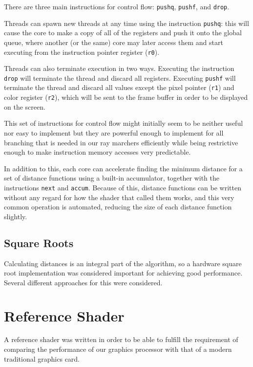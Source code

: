 			There are three main instructions for control flow: \texttt{pushq},
			\texttt{pushf}, and \texttt{drop}. 
			
			Threads can spawn new threads at any time using the instruction
			\texttt{pushq}: this will cause the core to make a copy of all of
			the registers and push it onto the global queue, where another (or
			the same) core may later access them and start executing from the
			instruction pointer register (\texttt{r0}).
			
			Threads can also terminate execution in two ways. Executing the
			instruction \texttt{drop} will terminate the thread and discard all
			registers. Executing \texttt{pushf} will terminate the thread and
			discard all values except the pixel pointer (\texttt{r1}) and color
			register (\texttt{r2}), which will be sent to the frame buffer in
			order to be displayed on the screen.
	
			This set of instructions for control flow might initially seem to
			be neither useful nor easy to implement but they are powerful
			enough to implement for all branching that is needed in our ray
			marchers efficiently while being restrictive enough to make
			instruction memory accesses very predictable.

			In addition to this, each core can accelerate finding the minimum 
			distance for a set of distance functions using a built-in 
			accumulator, together with the instructions \texttt{next} and 
			\texttt{accum}. Because of this, distance functions can be written
			without any regard for how the shader that called them works, and
			this very common operation is automated, reducing the size of each
			distance function slightly.
		
		\subsection{Square Roots}
			
			Calculating distances is an integral part of the algorithm, so a
			hardware square root implementation was considered important for 
			achieving good performance. Several different approaches for this 
			were considered.
			
	\section{Reference Shader} \label{implshader}
		
		A reference shader was written in order to be able to fulfill the
		requirement of comparing the performance of our graphics processor with
		that of a modern traditional graphics card. 
	
